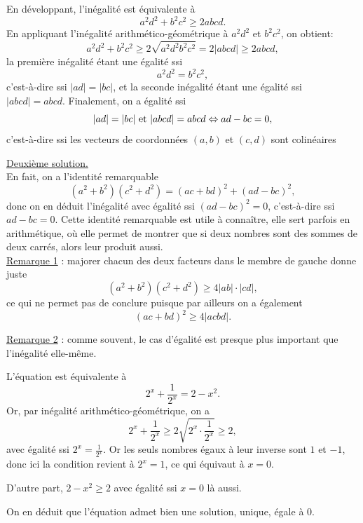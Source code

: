 \begin{Soln}{66}
En développant, l'inégalité est équivalente à
\[
a^2d^2+b^2c^2 \geq 2abcd.
\]
En appliquant l'inégalité arithmético-géométrique à $a^2d^2$ et $b^2c^2$, on obtient:
\[
a^2d^2+b^2c^2 \geq
2\sqrt{a^2d^2b^2c^2}
=2|abcd|
\geq 2abcd,
\]
la première inégalité étant une égalité ssi
\[ a^2d^2=b^2c^2,\]
c'est-à-dire ssi $|ad|=|bc|$, et la seconde inégalité étant une égalité ssi $|abcd|=abcd$. Finalement, on a égalité ssi
\[
|ad|=|bc| \text{ et }  |abcd|=abcd \\
\Leftrightarrow ad-bc=0,
\]
c'est-à-dire ssi les vecteurs de coordonnées $(a,b)$ et $(c,d)$ sont colinéaires

\underline{Deuxième solution.}\\
En fait, on a l'identité remarquable
\[ (a^2+b^2)(c^2+d^2)=  (ac+bd)^2 + (ad-bc)^2,\]
donc on en déduit l'inégalité avec égalité ssi $(ad-bc)^2=0$, c'est-à-dire ssi $ad-bc=0$. Cette identité remarquable est utile à connaître, elle sert parfois en arithmétique, où elle permet de montrer que si deux nombres sont des sommes de deux carrés, alors leur produit aussi.\\


\underline{Remarque 1} : majorer chacun des deux facteurs dans le membre de gauche donne juste
\[ (a^2+b^2)(c^2+d^2) \geq 4|ab|\cdot|cd|,\]
ce qui ne permet pas de conclure puisque par ailleurs on a également
\[ (ac+bd)^2 \geq 4|acbd|.\]

\underline{Remarque 2} : comme souvent, le cas d'égalité est presque plus important que l'inégalité elle-même.

\end{Soln}
\begin{Soln}{67}
L'équation est équivalente à
\[ 2^x +\frac{1}{2^x} = 2-x^2.\]
Or, par inégalité arithmético-géométrique, on a
\[ 2^x +\frac{1}{2^x} \geq 2\sqrt{2^x\cdot \frac{1}{2^x}} \geq 2,\]
avec égalité ssi $2^x = \frac{1}{2^x}$. Or les seuls nombres égaux à leur inverse sont $1$ et $-1$, donc ici la condition revient à $2^x=1$, ce qui équivaut à $x=0$.

D'autre part, $2-x^2\geq 2$ avec égalité ssi $x=0$ là aussi.

On en déduit que l'équation admet bien une solution, unique, égale à $0$.
\end{Soln}

